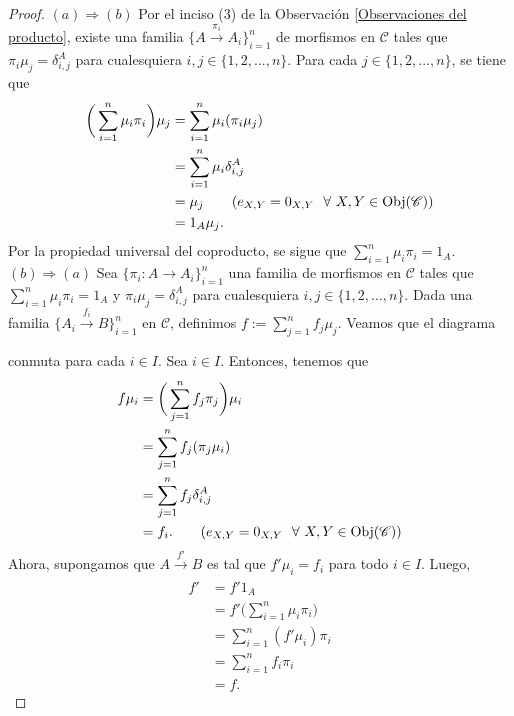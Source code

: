 \documentclass[tesis]{subfiles}
\begin{document}
\begin{proof}\leavevmode

    $(a)\Rightarrow(b)$ Por el inciso (3) de la Observación \ref{Observaciones del producto}, existe una familia $\{A\xrightarrow[]{\pi_i} A_i\}_{i=1}^n$ de morfismos en $\mathscr{C}$ tales que $\pi_i\mu_j = \delta^A_{i,j}$ para cualesquiera $i,j\in\{1,2,...,n\}$. Para cada $j\in\{1,2,...,n\}$, se tiene que
    \begin{align*}
        \bigg(\sum_{i=1}^n \mu_i\pi_i\bigg)\mu_j &= \sum_{i=1}^n \mu_i(\pi_i\mu_j) \\
                                                 &= \sum_{i=1}^n \mu_i \delta^A_{i,j} \\
                                                 &= \mu_j \tag{$e_{X,Y}=0_{X,Y} \ \ \forall \ X,Y\in\text{Obj}(\mathscr{C})$} \\
                                                 &= 1_A\mu_j.
    \end{align*}
    Por la propiedad universal del coproducto, se sigue que $\sum_{i=1}^n \mu_i\pi_i = 1_A$. \\

    $(b)\Rightarrow(a)$ Sea $\{\pi_i:A\to A_i\}_{i=1}^n$ una familia de morfismos en $\mathscr{C}$ tales que $\sum_{i=1}^n \mu_i\pi_i = 1_A$ y $\pi_i\mu_j = \delta^A_{i,j}$ para cualesquiera $i,j\in\{1,2,...,n\}$. Dada una familia $\{A_i\xrightarrow[]{f_i} B\}_{i=1}^n$ en $\mathscr{C}$, definimos $f:=\sum_{j=1}^n f_j\mu_j$. Veamos que el diagrama
    \begin{center}
    \end{center}
    conmuta para cada $i\in I$. Sea $i\in I$. Entonces, tenemos que
    \begin{align*}
        f\mu_i &= \bigg( \sum_{j=1}^n f_j\pi_j \bigg) \mu_i \\
               &= \sum_{j=1}^n f_j(\pi_j\mu_i) \\
               &= \sum_{j=1}^n f_j \delta^A_{i,j} \\
               &= f_i. \tag{$e_{X,Y} = 0_{X,Y} \ \ \forall \ X,Y\in\text{Obj}(\mathscr{C})$}
    \end{align*}
    Ahora, supongamos que $A\xrightarrow[]{f'} B$ es tal que $f'\mu_i=f_i$ para todo $i\in I$. Luego,
    \begin{align*}
        f' &= f'1_A \\
           &= f'\bigg( \sum_{i=1}^n \mu_i\pi_i \bigg) \\
           &= \sum_{i=1}^n (f'\mu_i)\pi_i \\
           &= \sum_{i=1}^n f_i\pi_i \\
           &= f.
    \end{align*}
\end{proof}
\end{document}
